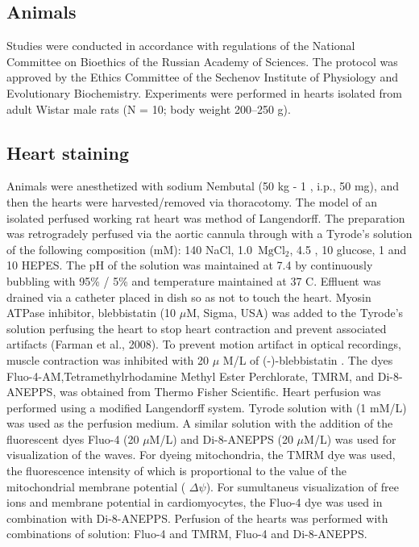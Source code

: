 \documentclass{biophys-new}
\begin{document}
\subsection*{Animals}

Studies were conducted in accordance with regulations of the National Committee on Bioethics of the Russian Academy of Sciences.
The protocol was approved by the Ethics Committee of the Sechenov Institute of Physiology and Evolutionary Biochemistry.
Experiments were performed in hearts isolated from adult Wistar male rats (N = 10; body weight 200–250 g).

\subsection*{Heart staining}

Animals were anesthetized with sodium Nembutal (50 kg - 1 , i.p., 50 mg), and then the hearts were harvested/removed via thoracotomy.
The model of an isolated perfused working rat heart was method of Langendorff.
The preparation was retrogradely perfused via the aortic cannula through with a Tyrode’s solution of the following composition (mM): 140 NaCl, 1.0 \(\,\mathrm{Mg}\mathrm{Cl}_2\), 4.5 , 10 glucose, 1  and 10 HEPES.
The pH of the solution was maintained at 7.4 by continuously bubbling with 95\% / 5\%  and temperature maintained at 37 C\degree.
Effluent was drained via a catheter placed in dish so as not to touch the heart.
Myosin ATPase inhibitor, blebbistatin (10 $\mu$M, Sigma, USA) was added to the Tyrode’s solution perfusing the heart to stop heart contraction and prevent associated artifacts (Farman et al., 2008).
To prevent motion artifact in optical recordings, muscle contraction was inhibited with 20 $\mu$ M/L of (-)-blebbistatin \cite{kong2014role}.
The dyes Fluo-4-AM,Tetramethylrhodamine Methyl Ester Perchlorate, TMRM, and Di-8-ANEPPS, was obtained from Thermo Fisher Scientific.
Heart perfusion was performed using a modified Langendorff system. Tyrode solution with  (1 mM/L) was used as the perfusion medium.
A similar solution with the addition of the fluorescent dyes Fluo-4 (20 $\mu$M/L) and Di-8-ANEPPS (20 $\mu$M/L) was used for visualization of the  waves.
For dyeing mitochondria, the TMRM dye was used, the fluorescence intensity of which is proportional to the value of the mitochondrial membrane potential ( $\Delta\psi$).
For sumultaneus visualization of free  ions and membrane potential in cardiomyocytes, the Fluo-4 dye was used in combination with Di-8-ANEPPS.
Perfusion of the hearts was performed with combinations of solution: Fluo-4 and TMRM, Fluo-4 and Di-8-ANEPPS.
\end{document}
